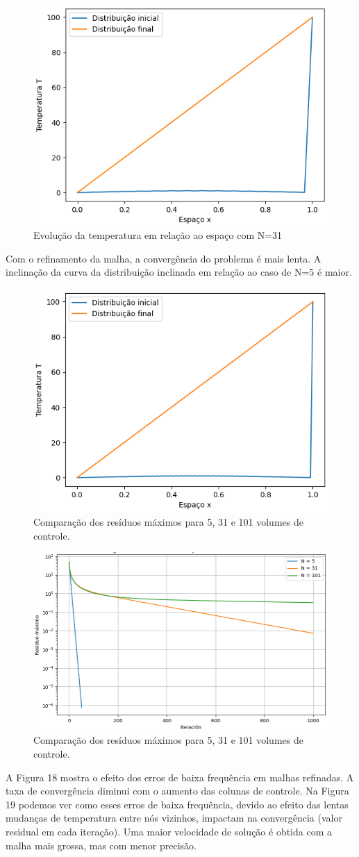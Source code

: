 \documentclass[]{article}
\begin{document}
\begin{figure}[H]
	\centering
	\includegraphics[width=.65\textwidth]{figures/3-3}
	\caption{Evolução da temperatura em relação ao espaço com N=31}
\end{figure}

Com o refinamento da malha, a convergência do problema é mais lenta. A inclinação da curva da distribuição inclinada em relação ao caso de N=5 é maior.

\begin{figure}[H]
	\centering
	\includegraphics[width=.65\textwidth]{figures/3-4}
	\caption{Comparação dos resíduos máximos para 5, 31 e 101 volumes de controle.}
\end{figure}

\begin{figure}[H]
	\centering
	\includegraphics[width=.65\textwidth]{figures/3-1}
	\caption{Comparação dos resíduos máximos para 5, 31 e 101 volumes de controle.}
\end{figure}
A Figura 18 mostra o efeito dos erros de baixa frequência em malhas refinadas. A taxa de convergência diminui com o aumento das colunas de controle. Na Figura 19 podemos ver como esses erros de baixa frequência, devido ao efeito das lentas mudanças de temperatura entre nós vizinhos, impactam na convergência (valor residual em cada iteração). Uma maior velocidade de solução é obtida com a malha mais grossa, mas com menor precisão.
\end{document}
